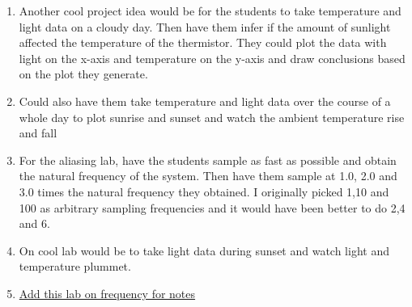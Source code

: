 \documentclass{article}
\begin{document}
\begin{enumerate}[itemsep=-5pt]
\item Another cool project idea would be for the students to take temperature and light data on a cloudy day. Then have them infer if the amount of sunlight affected the temperature of the thermistor. They could plot the data with light on the x-axis and temperature on the y-axis and draw conclusions based on the plot they generate.
\item Could also have them take temperature and light data over the course of a whole day to plot sunrise and sunset and watch the ambient temperature rise and fall
\item For the aliasing lab, have the students sample as fast as possible and obtain the natural frequency of the system. Then have them sample at 1.0, 2.0 and 3.0 times the natural frequency they obtained. I originally picked 1,10 and 100 as arbitrary sampling frequencies and it would have been better to do 2,4 and 6.
\item On cool lab would be to take light data during sunset and watch light and temperature plummet.
\item \href{https://learn.adafruit.com/circuit-playground-o-phonor/musical-note-basics}{Add this lab on frequency for notes}
\end{enumerate}

\newpage



%

%

%

%

%














\end{document}
